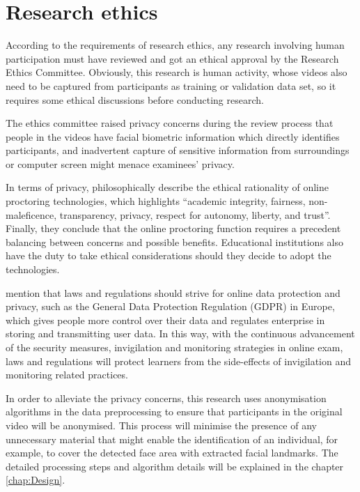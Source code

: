 \section{Research ethics}
\label{sec:Research ethics}
According to the requirements of research ethics, any research involving human participation must have reviewed and got an ethical approval by the Research Ethics Committee.
Obviously, this research is human activity, whose videos also need to be captured from participants as training or validation data set, so it requires some ethical discussions before conducting research.

The ethics committee raised privacy concerns during the review process that people in the videos have facial biometric information which directly identifies participants, and inadvertent capture of sensitive information from surroundings or computer screen might menace examinees' privacy.

In terms of privacy, \citet{coghlan2020good} philosophically describe the ethical rationality of online proctoring technologies, which highlights ``academic integrity, fairness, non-maleficence, transparency, privacy, respect for autonomy, liberty, and trust''.
Finally, they conclude that the online proctoring function requires a precedent balancing between concerns and possible benefits.
Educational institutions also have the duty to take ethical considerations should they decide to adopt the technologies.

\citet{bozkurt2020education} mention that laws and regulations should strive for online data protection and privacy, such as the General Data Protection Regulation (GDPR) in Europe, which gives people more control over their data and regulates enterprise in storing and transmitting user data.
In this way, with the continuous advancement of the security measures, invigilation and monitoring strategies in online exam, laws and regulations will protect learners from the side-effects of invigilation and monitoring related practices.

In order to alleviate the privacy concerns, this research uses anonymisation algorithms in the data preprocessing to ensure that participants in the original video will be anonymised.
This process will minimise the presence of any unnecessary material that might enable the identification of an individual, for example, to cover the detected face area with extracted facial landmarks.
The detailed processing steps and algorithm details will be explained in the chapter \ref{chap:Design}.